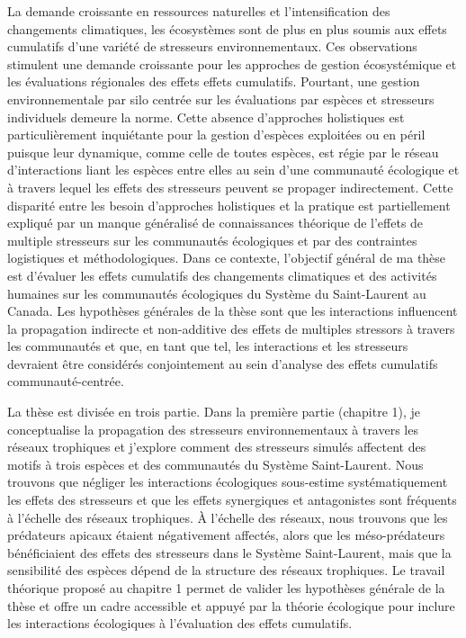 La demande croissante en ressources naturelles et l'intensification des
changements climatiques, les écosystèmes sont de plus en plus soumis aux
effets cumulatifs d'une variété de stresseurs environnementaux. Ces
observations stimulent une demande croissante pour les approches de
gestion écosystémique et les évaluations régionales des effets effets
cumulatifs. Pourtant, une gestion environnementale par silo centrée sur
les évaluations par espèces et stresseurs individuels demeure la norme.
Cette absence d'approches holistiques est particulièrement inquiétante
pour la gestion d'espèces exploitées ou en péril puisque leur dynamique,
comme celle de toutes espèces, est régie par le réseau d'interactions
liant les espèces entre elles au sein d'une communauté écologique et à
travers lequel les effets des stresseurs peuvent se propager
indirectement. Cette disparité entre les besoin d'approches holistiques
et la pratique est partiellement expliqué par un manque généralisé de
connaissances théorique de l'effets de multiple stresseurs sur les
communautés écologiques et par des contraintes logistiques et
méthodologiques. Dans ce contexte, l'objectif général de ma thèse est
d'évaluer les effets cumulatifs des changements climatiques et des
activités humaines sur les communautés écologiques du Système du
Saint-Laurent au Canada. Les hypothèses générales de la thèse sont que
les interactions influencent la propagation indirecte et non-additive
des effets de multiples stressors à travers les communautés et que, en
tant que tel, les interactions et les stresseurs devraient être
considérés conjointement au sein d'analyse des effets cumulatifs
communauté-centrée.

La thèse est divisée en trois partie. Dans la première partie (chapitre
1), je conceptualise la propagation des stresseurs environnementaux à
travers les réseaux trophiques et j'explore comment des stresseurs
simulés affectent des motifs à trois espèces et des communautés du
Système Saint-Laurent. Nous trouvons que négliger les interactions
écologiques sous-estime systématiquement les effets des stresseurs et
que les effets synergiques et antagonistes sont fréquents à l'échelle
des réseaux trophiques. À l'échelle des réseaux, nous trouvons que les
prédateurs apicaux étaient négativement affectés, alors que les
méso-prédateurs bénéficiaient des effets des stresseurs dans le Système
Saint-Laurent, mais que la sensibilité des espèces dépend de la
structure des réseaux trophiques. Le travail théorique proposé au
chapitre 1 permet de valider les hypothèses générale de la thèse et
offre un cadre accessible et appuyé par la théorie écologique pour
inclure les interactions écologiques à l'évaluation des effets
cumulatifs.

